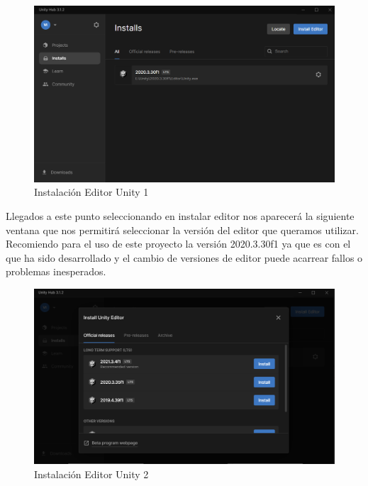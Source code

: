 \newpage
\begin{figure}[h]
\centering
\label{Instalación Editor Unity 1}
\includegraphics[width=\textwidth]{img/hub1.PNG}
\caption{Instalación Editor Unity 1 }
\end{figure}

Llegados a este punto seleccionando en instalar editor nos aparecerá la siguiente ventana que nos permitirá seleccionar la versión del editor que queramos utilizar. Recomiendo para el uso de este proyecto la versión 2020.3.30f1 ya que es con el que ha sido desarrollado y el cambio de versiones de editor puede acarrear fallos o problemas inesperados.


\begin{figure}[h]
\centering
\label{Instalación Editor Unity 2}
\includegraphics[width=\textwidth]{img/hub2.PNG}
\caption{Instalación Editor Unity 2}
\end{figure}


\newpage


\newpage
